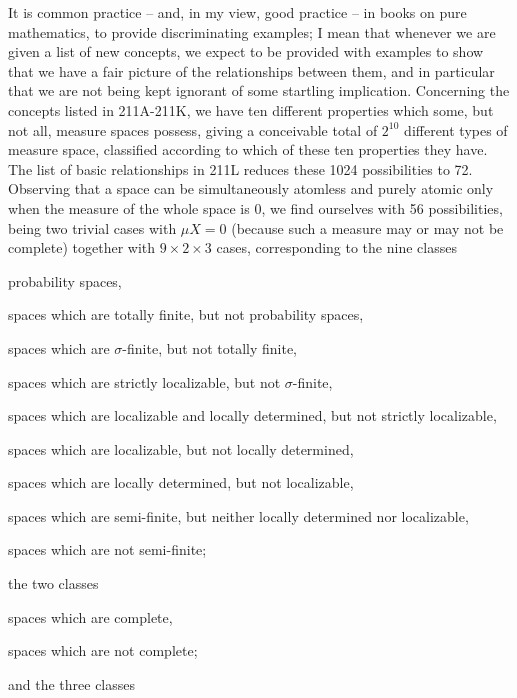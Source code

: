 
\def\chaptername{Taxonomy of measure spaces}
\def\sectionname{Examples}


It is common practice -- and, in my view, good
practice -- in books on pure mathematics, to provide discriminating
examples;  I mean that whenever we are given a list of new concepts, we
expect to be provided with examples to show that we have a fair picture
of the relationships between them, and in particular that we are not
being kept ignorant of some startling implication.   Concerning the
concepts listed in
211A-211K, %
we have ten different properties which some, but
not all, measure spaces possess, giving a conceivable total of $2^{10}$
different types of measure space, classified according to which of these
ten properties they have.   The list of basic relationships in 211L
reduces these 1024 possibilities to 72.   Observing that a space can be
simultaneously atomless and purely atomic only when the measure of the
whole space is $0$, we find ourselves with 56 possibilities, being two
trivial cases with $\mu X=0$ (because such a measure may or may not be
complete) together with $9\times 2\times 3$ cases, corresponding to the
nine classes

\quad probability spaces,

\quad spaces which are totally finite, but not probability spaces,

\quad spaces which are $\sigma$-finite, but not totally finite,

\quad spaces which are strictly localizable, but not $\sigma$-finite,

\quad spaces which are localizable and locally determined, but not
strictly localizable,

\quad spaces which are localizable, but not locally determined,

\quad spaces which are locally determined, but not localizable,

\quad spaces which are semi-finite, but neither locally determined nor
localizable,

\quad spaces which are not semi-finite;

\noindent the two classes

\quad spaces which are complete,

\quad spaces which are not complete;

\noindent and the three classes

